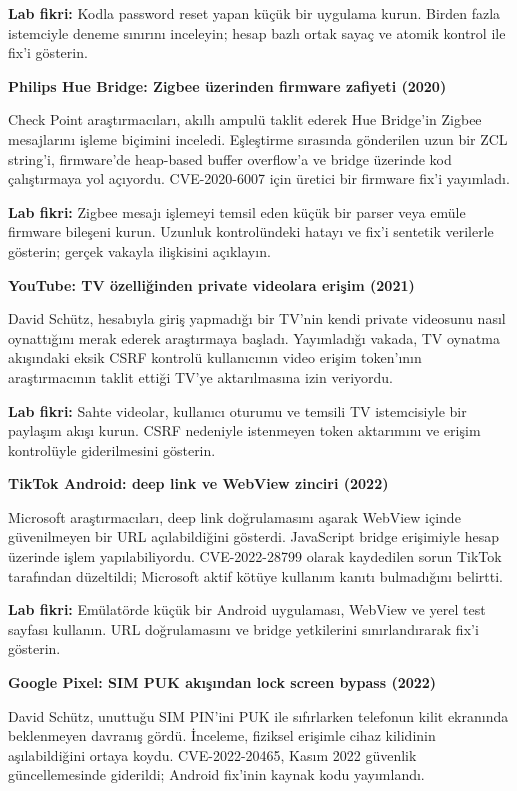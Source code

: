 \documentclass[11pt,a4paper]{article}
\begin{document}
\textbf{Lab fikri:} Kodla password reset yapan küçük bir uygulama kurun. Birden fazla istemciyle deneme sınırını inceleyin; hesap bazlı ortak sayaç ve atomik kontrol ile fix’i gösterin.

\par\addvspace{8pt}\noindent\textbf{Philips Hue Bridge: Zigbee üzerinden firmware zafiyeti (2020)}~\cite{hue}\par\nopagebreak
Check Point araştırmacıları, akıllı ampulü taklit ederek Hue Bridge’in Zigbee mesajlarını işleme biçimini inceledi. Eşleştirme sırasında gönderilen uzun bir ZCL string’i, firmware’de heap-based buffer overflow’a ve bridge üzerinde kod çalıştırmaya yol açıyordu. CVE-2020-6007 için üretici bir firmware fix’i yayımladı.

\textbf{Lab fikri:} Zigbee mesajı işlemeyi temsil eden küçük bir parser veya emüle firmware bileşeni kurun. Uzunluk kontrolündeki hatayı ve fix’i sentetik verilerle gösterin; gerçek vakayla ilişkisini açıklayın.

\par\addvspace{8pt}\noindent\textbf{YouTube: TV özelliğinden private videolara erişim (2021)}~\cite{youtube}\par\nopagebreak
David Schütz, hesabıyla giriş yapmadığı bir TV’nin kendi private videosunu nasıl oynattığını merak ederek araştırmaya başladı. Yayımladığı vakada, TV oynatma akışındaki eksik CSRF kontrolü kullanıcının video erişim token’ının araştırmacının taklit ettiği TV’ye aktarılmasına izin veriyordu.

\textbf{Lab fikri:} Sahte videolar, kullanıcı oturumu ve temsili TV istemcisiyle bir paylaşım akışı kurun. CSRF nedeniyle istenmeyen token aktarımını ve erişim kontrolüyle giderilmesini gösterin.

\par\addvspace{8pt}\noindent\textbf{TikTok Android: deep link ve WebView zinciri (2022)}~\cite{tiktok}\par\nopagebreak
Microsoft araştırmacıları, deep link doğrulamasını aşarak WebView içinde güvenilmeyen bir URL açılabildiğini gösterdi. JavaScript bridge erişimiyle hesap üzerinde işlem yapılabiliyordu. CVE-2022-28799 olarak kaydedilen sorun TikTok tarafından düzeltildi; Microsoft aktif kötüye kullanım kanıtı bulmadığını belirtti.

\textbf{Lab fikri:} Emülatörde küçük bir Android uygulaması, WebView ve yerel test sayfası kullanın. URL doğrulamasını ve bridge yetkilerini sınırlandırarak fix’i gösterin.

\par\addvspace{8pt}\noindent\textbf{Google Pixel: SIM PUK akışından lock screen bypass (2022)}~\cite{pixel}\par\nopagebreak
David Schütz, unuttuğu SIM PIN’ini PUK ile sıfırlarken telefonun kilit ekranında beklenmeyen davranış gördü. İnceleme, fiziksel erişimle cihaz kilidinin aşılabildiğini ortaya koydu. CVE-2022-20465, Kasım 2022 güvenlik güncellemesinde giderildi; Android fix’inin kaynak kodu yayımlandı.
\end{document}
